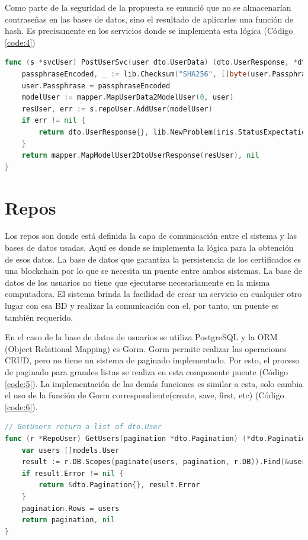 Como parte de la seguridad de la propuesta se enunció que no se almacenarían contraseñas en las bases de datos, sino el resultado de aplicarles una función de hash. Es precisamente en los servicios donde se implementa esta lógica (Código \ref{code:4})

\begin{lstlisting}[language=Go,caption={Servicio para crear un usuario}, label={code:4}]
func (s *svcUser) PostUserSvc(user dto.UserData) (dto.UserResponse, *dto.Problem) {
	passphraseEncoded, _ := lib.Checksum("SHA256", []byte(user.Passphrase))
	user.Passphrase = passphraseEncoded
	modelUser := mapper.MapUserData2ModelUser(0, user)
	resUser, err := s.repoUser.AddUser(modelUser)
	if err != nil {
		return dto.UserResponse{}, lib.NewProblem(iris.StatusExpectationFailed, schema.ErrBuntdb, err.Error())
	}
	return mapper.MapModelUser2DtoUserResponse(resUser), nil
}
\end{lstlisting}

\section{Repos}
Los repos son donde está definida la capa de comunicación entre el sistema y las bases de datos usadas. Aquí es donde se implementa la lógica para la obtención de esos datos. La base de datos que garantiza la persistencia de los certificados es una blockchain por lo que se necesita un puente entre ambos sistemas. La base de datos de los usuarios no tiene que ejecutarse necesariamente en la misma computadora. El sistema brinda la facilidad de crear un servicio en cualquier otro lugar con esa BD y realizar la comunicación con el, por tanto, un puente es también requerido.

En el caso de la base de datos de usuarios se utiliza PostgreSQL y la ORM (Object Relational Mapping) es Gorm. Gorm permite realizar las operaciones CRUD, pero no tiene un sistema de paginado implementado. Por esto, el proceso de paginado para grandes listas se realiza en esta componente puente (Código \ref{code:5}). La implementación de las demás funciones es similar a esta, solo cambia el uso de la función de Gorm correspondiente(create, save, first, etc) (Código \ref{code:6}).

\begin{lstlisting}[language=Go,caption={Función que consulta los usuarios}, label={code:5}]
// GetUsers return a list of dto.User
func (r *RepoUser) GetUsers(pagination *dto.Pagination) (*dto.Pagination, error) {
	var users []models.User
	result := r.DB.Scopes(paginate(users, pagination, r.DB)).Find(&users)
	if result.Error != nil {
		return &dto.Pagination{}, result.Error
	}
	pagination.Rows = users
	return pagination, nil
}
\end{lstlisting}

